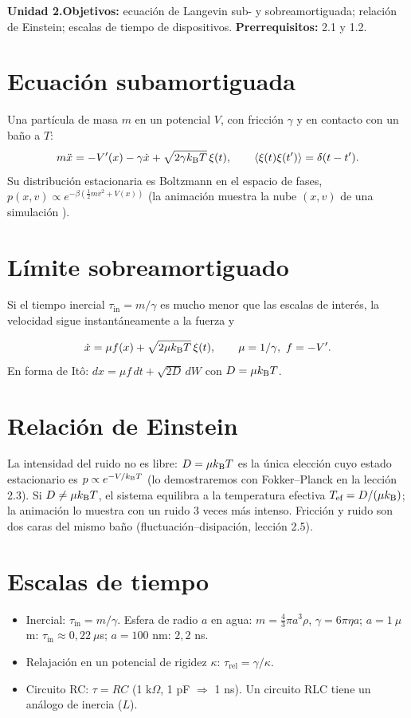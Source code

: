 \documentclass[11pt,a4paper]{article}
\begin{document}

\noindent\textbf{Unidad 2.}\quad\textbf{Objetivos:} ecuación de Langevin sub- y sobreamortiguada; relación de Einstein;
escalas de tiempo de dispositivos. \textbf{Prerrequisitos:} 2.1 y 1.2.

\section{Ecuación subamortiguada}
Una partícula de masa $m$ en un potencial $V$, con fricción $\gamma$ y en contacto con un baño a $T$:
\begin{equation}m\ddot x=-V'(x)-\gamma\dot x+\sqrt{2\gamma k_{\mathrm B} T}\,\xi(t),\qquad\langle\xi(t)\xi(t')\rangle=\delta(t-t').\end{equation}
Su distribución estacionaria es Boltzmann en el espacio de fases, $p(x,v)\propto e^{-\beta(\frac12mv^2+V(x))}$
(la animación muestra la nube $(x,v)$ de una simulación \evS).

\section{Límite sobreamortiguado}
Si el tiempo inercial $\tau_{\text{in}}=m/\gamma$ es mucho menor que las escalas de interés, la velocidad sigue
instantáneamente a la fuerza y
\begin{resultado}
\begin{equation}\dot x=\mu f(x)+\sqrt{2\mu k_{\mathrm B} T}\,\xi(t),\qquad\mu=1/\gamma,\ f=-V'.\end{equation}
En forma de Itô: $dx=\mu f\,dt+\sqrt{2D}\,dW$ con $D=\mu k_{\mathrm B} T$.
\end{resultado}

\section{Relación de Einstein}
La intensidad del ruido no es libre: $D=\mu k_{\mathrm B} T$ es la única elección cuyo estado estacionario es $p\propto e^{-V/k_{\mathrm B} T}$
(lo demostraremos con Fokker--Planck en la lección 2.3). Si $D\neq\mu k_{\mathrm B} T$, el sistema equilibra a la temperatura
efectiva $T_{\text{ef}}=D/(\mu k_{\mathrm B})$; la animación lo muestra con un ruido 3 veces más intenso. Fricción y ruido son dos
caras del mismo baño (fluctuación--disipación, lección 2.5).

\section{Escalas de tiempo}
\begin{itemize}[nosep]
\item Inercial: $\tau_{\text{in}}=m/\gamma$. Esfera de radio $a$ en agua: $m=\frac43\pi a^3\rho$, $\gamma=6\pi\eta a$; $a=1\ \mu$m: $\tau_{\text{in}}\approx0{,}22\ \mu$s; $a=100$ nm: $2{,}2$ ns.
\item Relajación en un potencial de rigidez $\kappa$: $\tau_{\text{rel}}=\gamma/\kappa$.
\item Circuito RC: $\tau=RC$ (1 k$\Omega$, 1 pF $\Rightarrow$ 1 ns). Un circuito RLC tiene un análogo de inercia ($L$).
\end{itemize}
\end{document}
